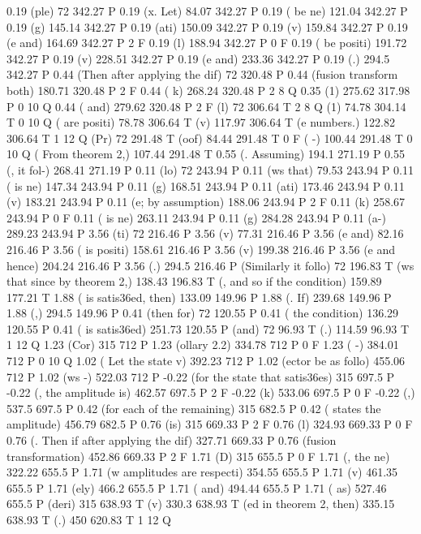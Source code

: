 0.19 (ple) 72 342.27 P
0.19 (x. Let) 84.07 342.27 P
0.19 ( be ne) 121.04 342.27 P
0.19 (g) 145.14 342.27 P
0.19 (ati) 150.09 342.27 P
0.19 (v) 159.84 342.27 P
0.19 (e and) 164.69 342.27 P
2 F
0.19 (l) 188.94 342.27 P
0 F
0.19 ( be positi) 191.72 342.27 P
0.19 (v) 228.51 342.27 P
0.19 (e and) 233.36 342.27 P
0.19 (.) 294.5 342.27 P
0.44 (Then after applying the dif) 72 320.48 P
0.44 (fusion transform both) 180.71 320.48 P
2 F
0.44 ( k) 268.24 320.48 P
2 8 Q
0.35 (1) 275.62 317.98 P
0 10 Q
0.44 ( and) 279.62 320.48 P
2 F
(l) 72 306.64 T
2 8 Q
(1) 74.78 304.14 T
0 10 Q
( are positi) 78.78 306.64 T
(v) 117.97 306.64 T
(e numbers.) 122.82 306.64 T
1 12 Q
(Pr) 72 291.48 T
(oof) 84.44 291.48 T
0 F
( -) 100.44 291.48 T
0 10 Q
( From theorem 2,) 107.44 291.48 T
0.55 (. Assuming) 194.1 271.19 P
0.55 (, it fol-) 268.41 271.19 P
0.11 (lo) 72 243.94 P
0.11 (ws that) 79.53 243.94 P
0.11 ( is ne) 147.34 243.94 P
0.11 (g) 168.51 243.94 P
0.11 (ati) 173.46 243.94 P
0.11 (v) 183.21 243.94 P
0.11 (e; by assumption) 188.06 243.94 P
2 F
0.11 (k) 258.67 243.94 P
0 F
0.11 ( is ne) 263.11 243.94 P
0.11 (g) 284.28 243.94 P
0.11 (a-) 289.23 243.94 P
3.56 (ti) 72 216.46 P
3.56 (v) 77.31 216.46 P
3.56 (e and) 82.16 216.46 P
3.56 ( is positi) 158.61 216.46 P
3.56 (v) 199.38 216.46 P
3.56 (e and hence) 204.24 216.46 P
3.56 (.) 294.5 216.46 P
(Similarly it follo) 72 196.83 T
(ws that since by theorem 2,) 138.43 196.83 T
(, and so if the condition) 159.89 177.21 T
1.88 ( is satis\336ed, then) 133.09 149.96 P
1.88 (. If) 239.68 149.96 P
1.88 (,) 294.5 149.96 P
0.41 (then for) 72 120.55 P
0.41 ( the condition) 136.29 120.55 P
0.41 ( is satis\336ed) 251.73 120.55 P
(and) 72 96.93 T
(.) 114.59 96.93 T
1 12 Q
1.23 (Cor) 315 712 P
1.23 (ollary 2.2) 334.78 712 P
0 F
1.23 ( -) 384.01 712 P
0 10 Q
1.02 ( Let the state v) 392.23 712 P
1.02 (ector be as follo) 455.06 712 P
1.02 (ws -) 522.03 712 P
-0.22 (for the state that satis\336es) 315 697.5 P
-0.22 (, the amplitude is) 462.57 697.5 P
2 F
-0.22 (k) 533.06 697.5 P
0 F
-0.22 (,) 537.5 697.5 P
0.42 (for each of the remaining) 315 682.5 P
0.42 ( states the amplitude) 456.79 682.5 P
0.76 (is) 315 669.33 P
2 F
0.76 (l) 324.93 669.33 P
0 F
0.76 (. Then if after applying the dif) 327.71 669.33 P
0.76 (fusion transformation) 452.86 669.33 P
2 F
1.71 (D) 315 655.5 P
0 F
1.71 (, the ne) 322.22 655.5 P
1.71 (w amplitudes are respecti) 354.55 655.5 P
1.71 (v) 461.35 655.5 P
1.71 (ely) 466.2 655.5 P
1.71 ( and) 494.44 655.5 P
1.71 ( as) 527.46 655.5 P
(deri) 315 638.93 T
(v) 330.3 638.93 T
(ed in theorem 2, then) 335.15 638.93 T
(.) 450 620.83 T
1 12 Q
